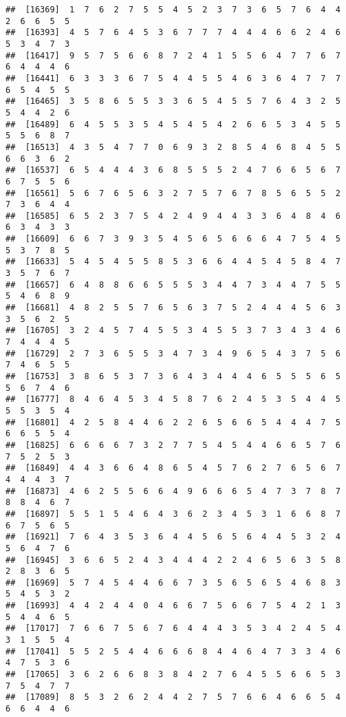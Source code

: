 \documentclass[
]{book}
\begin{document}
\begin{verbatim}
##  [16369]  1  7  6  2  7  5  5  4  5  2  3  7  3  6  5  7  6  4  4  2  6  6  5  5
##  [16393]  4  5  7  6  4  5  3  6  7  7  7  4  4  4  6  6  2  4  6  5  3  4  7  3
##  [16417]  9  5  7  5  6  6  8  7  2  4  1  5  5  6  4  7  7  6  7  6  4  4  4  6
##  [16441]  6  3  3  3  6  7  5  4  4  5  5  4  6  3  6  4  7  7  7  6  5  4  5  5
##  [16465]  3  5  8  6  5  5  3  3  6  5  4  5  5  7  6  4  3  2  5  5  4  4  2  6
##  [16489]  6  4  5  5  3  5  4  5  4  5  4  2  6  6  5  3  4  5  5  5  5  6  8  7
##  [16513]  4  3  5  4  7  7  0  6  9  3  2  8  5  4  6  8  4  5  5  6  6  3  6  2
##  [16537]  6  5  4  4  4  3  6  8  5  5  5  2  4  7  6  6  5  6  7  6  7  5  5  6
##  [16561]  5  6  7  6  5  6  3  2  7  5  7  6  7  8  5  6  5  5  2  7  3  6  4  4
##  [16585]  6  5  2  3  7  5  4  2  4  9  4  4  3  3  6  4  8  4  6  6  3  4  3  3
##  [16609]  6  6  7  3  9  3  5  4  5  6  5  6  6  6  4  7  5  4  5  5  3  7  8  5
##  [16633]  5  4  5  4  5  5  8  5  3  6  6  4  4  5  4  5  8  4  7  3  5  7  6  7
##  [16657]  6  4  8  8  6  6  5  5  5  3  4  4  7  3  4  4  7  5  5  5  4  6  8  9
##  [16681]  4  8  2  5  5  7  6  5  6  3  7  5  2  4  4  4  5  6  3  3  5  6  2  5
##  [16705]  3  2  4  5  7  4  5  5  3  4  5  5  3  7  3  4  3  4  6  7  4  4  4  5
##  [16729]  2  7  3  6  5  5  3  4  7  3  4  9  6  5  4  3  7  5  6  7  4  6  5  5
##  [16753]  3  8  6  5  3  7  3  6  4  3  4  4  4  6  5  5  5  6  5  5  6  7  4  6
##  [16777]  8  4  6  4  5  3  4  5  8  7  6  2  4  5  3  5  4  4  5  5  5  3  5  4
##  [16801]  4  2  5  8  4  4  6  2  2  6  5  6  6  5  4  4  4  7  5  6  6  5  5  4
##  [16825]  6  6  6  6  7  3  2  7  7  5  4  5  4  4  6  6  5  7  6  7  5  2  5  3
##  [16849]  4  4  3  6  6  4  8  6  5  4  5  7  6  2  7  6  5  6  7  4  4  4  3  7
##  [16873]  4  6  2  5  5  6  6  4  9  6  6  6  5  4  7  3  7  8  7  8  8  4  6  7
##  [16897]  5  5  1  5  4  6  4  3  6  2  3  4  5  3  1  6  6  8  7  6  7  5  6  5
##  [16921]  7  6  4  3  5  3  6  4  4  5  6  5  6  4  4  5  3  2  4  5  6  4  7  6
##  [16945]  3  6  6  5  2  4  3  4  4  4  2  2  4  6  5  6  3  5  8  2  8  3  6  5
##  [16969]  5  7  4  5  4  4  6  6  7  3  5  6  5  6  5  4  6  8  3  5  4  5  3  2
##  [16993]  4  4  2  4  4  0  4  6  6  7  5  6  6  7  5  4  2  1  3  5  4  4  6  5
##  [17017]  7  6  6  7  5  6  7  6  4  4  4  3  5  3  4  2  4  5  4  3  1  5  5  4
##  [17041]  5  5  2  5  4  4  6  6  6  8  4  4  6  4  7  3  3  4  6  4  7  5  3  6
##  [17065]  3  6  2  6  6  8  3  8  4  2  7  6  4  5  5  6  6  5  3  7  5  4  7  7
##  [17089]  8  5  3  2  6  2  4  4  2  7  5  7  6  6  4  6  6  5  4  6  6  4  4  6

\end{verbatim}
\end{document}

